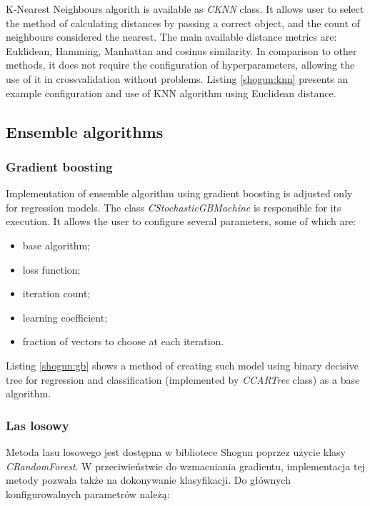 K-Nearest Neighbours algorith is available as \textit{CKNN} class. It allows user to select the method of calculating distances by passing a correct object, and the count of neighbours considered the nearest. The main available distance metrics are: Euklidean, Hamming, Manhattan and cosinus similarity. In comparison to other methods, it does not require the configuration of hyperparameters, allowing the use of it in crossvalidation without problems. Listing \ref{shogun:knn} presents an example configuration and use of KNN algorithm using Euclidean distance.


\subsection{Ensemble algorithms}
\subsubsection{Gradient boosting}

Implementation of ensemble algorithm using gradient boosting is adjusted only for regression models. The class \textit{CStochasticGBMachine} is responsible for its execution. It allows the user to configure several parameters, some of which are:

\begin{itemize}
	\item base algorithm;
	\item loss function;
	\item iteration count;
	\item learning coefficient;
	\item fraction of vectors to choose at each iteration.
\end{itemize}

Listing \ref{shogun:gb} shows a method of creating such model using binary decisive tree for regression and classification (implemented by \textit{CCARTree} class) as a base algorithm.


\subsubsection{Las losowy}
Metoda lasu losowego jest dostępna w bibliotece Shogun poprzez użycie klasy \textit{CRandomForest}. W przeciwieństwie do wzmacniania gradientu, implementacja tej metody pozwala także na dokonywanie klasyfikacji. Do głównych konfigurowalnych parametrów należą:

